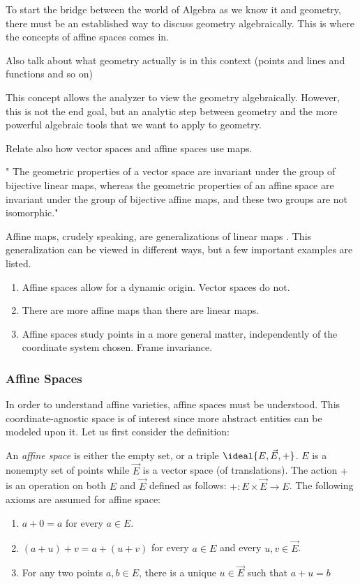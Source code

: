 To start the bridge between the world of Algebra as we know it and geometry, there must be an established way to discuss geometry algebraically. This is where the concepts of affine spaces comes in.  

Also talk about what geometry actually is in this context (points and lines and functions and so on)

This concept allows the analyzer to view the geometry algebraically. However, this is not the end goal, but an analytic step between geometry and the more powerful algebraic tools that we want to apply to geometry. 

Relate also how vector spaces and affine spaces use maps. 

" The geometric properties of a vector space are invariant
under the group of bijective linear maps, whereas the geometric properties
of an affine space are invariant under the group of bijective affine maps,
and these two groups are not isomorphic." \cite{gallier2025affine}

Affine maps, crudely speaking, are generalizations of linear maps \cite{gallier2025affine}. This generalization can be viewed in different ways, but a few important examples are listed. 

\begin{enumerate}
    \item Affine spaces allow for a dynamic origin. Vector spaces do not.
    \item There are more affine maps than there are linear maps.
    \item Affine spaces study points in a more general matter, independently of the coordinate system chosen. Frame invariance.
\end{enumerate}

\subsubsection{Affine Spaces}
In order to understand affine varieties, affine spaces must be understood. This coordinate-agnostic space is of interest since more abstract entities can be modeled upon it. Let us first consider the definition: 

\begin{definition}
    An \textit{affine space} is either the empty set, or a triple $\ideal{ E, \vec{E}, +}$. $E$ is a nonempty set of points while $\vec{E}$ is a vector space (of translations). The action $+$ is an operation on both $E$ and $\vec{E}$ defined as follows: $+: E \times \vec{E} \rightarrow E$. The following axioms are assumed for affine space:
    \begin{enumerate}[label=A\arabic*]
        \item $a + 0 = a$ for every $a \in E$.
        \item $(a + u) + v = a + (u + v)$ for every $a \in E$ and every $u,v \in \vec{E}$.
        \item For any two points $a,b \in E$, there is a unique $u \in \vec{E}$ such that $a + u = b$
    \end{enumerate}
\end{definition}

